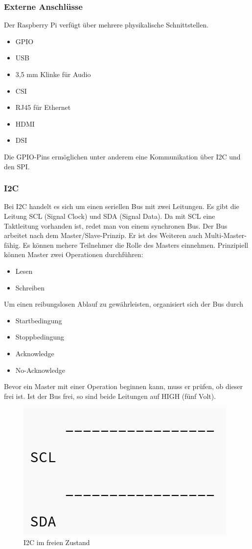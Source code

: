 
\subsubsection{Externe Anschlüsse}
Der Raspberry Pi verfügt über mehrere physikalische Schnittstellen. 
\begin{itemize}
\item \ac{GPIO}
\item USB
\item 3,5 mm Klinke für Audio
\item \ac{CSI}
\item RJ45 für Ethernet
\item HDMI
\item \ac{DSI}
\end{itemize}

Die \ac{GPIO}-Pins ermöglichen unter anderem eine Kommunikation über \ac{I2C} und den \ac{SPI}. 

\subsubsection{\ac{I2C}} Bei \ac{I2C} handelt es sich um einen seriellen Bus mit zwei Leitungen. Es gibt die Leitung SCL (Signal Clock) und SDA (Signal Data). Da mit SCL eine Taktleitung vorhanden ist, redet man von einem synchronen Bus. Der Bus arbeitet nach dem Master/Slave-Prinzip. Er ist des Weiteren auch Multi-Master-fähig. Es können mehere Teilnehmer die Rolle des Masters einnehmen. Prinzipiell können Master zwei Operationen durchführen: 
\begin{itemize}
\item Lesen
\item Schreiben
\end{itemize} 
Um einen reibungslosen Ablauf zu gewährleisten, organisiert sich der Bus durch
\begin{itemize}
\item Startbedingung
\item Stoppbedingung
\item Acknowledge
\item No-Acknowledge
\end{itemize}
Bevor ein Master mit einer Operation beginnen kann, muss er prüfen, ob dieser frei ist. Ist der Bus frei, so sind beide Leitungen auf HIGH (fünf Volt). 

\begin{figure}[h!] 
\includegraphics[scale=0.3]{bilder/i2c_frei}
\caption{\ac{I2C} im freien Zustand}
\label{i2c_frei}
\end{figure}

